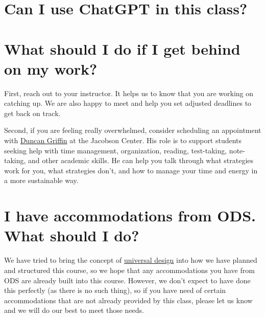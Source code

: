 \documentclass[
  letterpaper,
  DIV=11,
  numbers=noendperiod]{scrartcl}
\begin{document}
\hypertarget{ChatGPT}{%
\section{Can I use ChatGPT in this class?}\label{ChatGPT}}

\hypertarget{catchingup}{%
\section{What should I do if I get behind on my
work?}\label{catchingup}}

First, reach out to your instructor. It helps us to know that you are
working on catching up. We are also happy to meet and help you set
adjusted deadlines to get back on track.

Second, if you are feeling really overwhelmed, consider scheduling an
appointment with
\href{https://go.oncehub.com/LearningSpecialistDuncanGriffin}{Duncan
Griffin} at the Jacobson Center. His role is to support students seeking
help with time management, organization, reading, test-taking,
note-taking, and other academic skills. He can help you talk through
what strategies work for you, what strategies don't, and how to manage
your time and energy in a more sustainable way.

\hypertarget{ODS}{%
\section{I have accommodations from ODS. What should I do?}\label{ODS}}

We have tried to bring the concept of
\href{https://www.washington.edu/doit/what-universal-design-0}{universal
design} into how we have planned and structured this course, so we hope
that any accommodations you have from ODS are already built into this
course. However, we don't expect to have done this perfectly (as there
is no such thing), so if you have need of certain accommodations that
are not already provided by this class, please let us know and we will
do our best to meet those needs.
\end{document}
